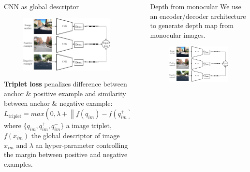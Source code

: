 \documentclass[final]{beamer}
\newlength{\sepwidth}
\newlength{\colwidth}
\newcommand{\separatorcolumn}{\begin{column}{\sepwidth}\end{column}}
\newcommand{\norm}[1]{\left\lVert#1\right\rVert}
\begin{document}
\begin{frame}[t]
\begin{columns}[t]
\begin{column}{\colwidth}
\begin{block}{CNN as global descriptor}
	\begin{figure}
	  \centering
	  \includegraphics[width=\linewidth]{vect/method/fig2/3n}
	\end{figure}	

	\textbf{Triplet loss} penalizes difference between anchor \& positive example and similarity between anchor \& negative example:
	\begin{equation*}
     	L_{\mathrm{triplet}} = max\left(0, \lambda + \norm{f(q_{im}) - f(q_{im}^+)}_2 - \norm{f(q_{im}) - f(q_{im}^-)}_2 \right),
	\end{equation*}
where $\{q_{im}, q_{im}^+, q_{im}^-\}$ a image triplet, $f(x_{im})$ the global descriptor of image $x_{im}$ and $\lambda$ an hyper-parameter controlling the margin between positive and negative examples.
  \end{block}
  
\end{column}

\separatorcolumn

\begin{column}{\colwidth}  
  
    \begin{block}{Depth from monocular}
    We use an encoder/decoder architecture to generate depth map from monocular images.
    
	\begin{figure}
	  \centering
	  \includegraphics[width=0.5\linewidth]{vect/method/fig2/3n}
	\end{figure}	
	

\end{block}
\end{column}
\end{columns}
\end{frame}
\end{document}
